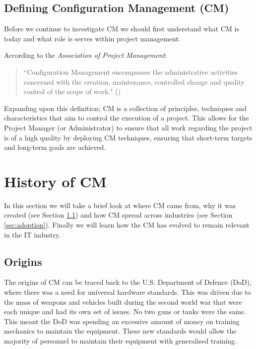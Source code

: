 \documentclass[cmpstyle]{ueacmpstyle}
\begin{document}
		\subsection{Defining Configuration Management (CM)} \label{sec:definition}
		Before we continue to investigate CM we should first understand what CM is today and what role is serves within project management.
		
		According to the \emph{Association of Project Management}: 
		
		\begin{quote}
		``Configuration Management encompasses the administrative activities concerned with the creation, maintenance, controlled change and quality control of the scope of work." (\cite{apmDef})
		\end{quote}
		
		Expanding upon this definition; CM is a collection of principles, techniques and characteristics that aim to control the execution of a project. This allows for the Project Manager (or Administrator) to ensure that all work regarding the project is of a high quality by deploying CM techniques, ensuring that short-term targets and long-term goals are achieved.
	
	\section{History of CM} \label{sec:history}
	In this section we will take a brief look at where CM came from, why it was created (see Section \ref{sec:origin}) and how CM spread across industries (see Section \ref{sec:adoption}). Finally we will learn how the CM has evolved to remain relevant in the IT industry.
	
		\subsection{Origins} \label{sec:origin}
		The origins of CM can be traced back to the U.S. Department of Defence (DoD), where there was a need for universal hardware standards. This was driven due to the mass of weapons and vehicles built during the second world war that were each unique and had its own set of issues. No two guns or tanks were the same. This meant the DoD was spending an excessive amount of money on training mechanics to maintain the equipment. These new standards would allow the majority of personnel to maintain their equipment with generalised training.
		
\end{document}
